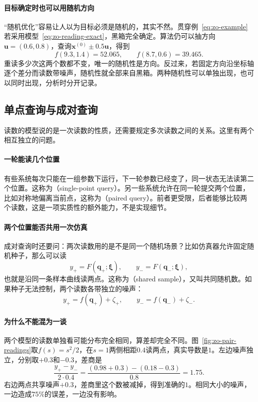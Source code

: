 \paragraph{目标确定时也可以用随机方向}
“随机优化”容易让人以为目标必须是随机的，其实不然。贯穿例~\eqref{eq:zo-example}若采用模型~\eqref{eq:zo-reading-exact}，黑箱完全确定。算法仍可以抽方向$\bm{u}=(0.6,0.8)$，查询$\bm{x}^{(0)}\pm0.5\bm{u}$，得到
\[
 f(9.3,1.4)=52.065,\qquad f(8.7,0.6)=39.465.
\]
重读多少次这两个数都不变，唯一的随机性是方向。反过来，若固定方向沿坐标轴逐个差分而读数带噪声，随机性就全部来自黑箱。两种随机性可以单独出现，也可以同时出现，分析时分开记录。

\subsection{单点查询与成对查询}
\label{sec:zo-pair-interface}

读数的模型说的是一次读数的性质，还需要规定多次读数之间的关系。这里有两个相互独立的问题。

\paragraph{一轮能读几个位置}
有些系统每次只能在一组参数下运行，下一轮参数已经变了，同一状态无法读第二个位置。这称为（single-point query）。另一些系统允许在同一轮提交两个位置，比如对称地偏离当前点，这称为（paired query）。前者更受限，后者能够比较两个读数，这是一项实质性的额外能力，不是实现细节。

\paragraph{两个位置能否共用一次仿真}
成对查询时还要问：两次读数用的是不是同一个随机场景？比如仿真器允许固定随机种子，那么可以读
\begin{equation}
 y_+=F(\bm{q}_+;\bm{\xi}),\qquad y_-=F(\bm{q}_-;\bm{\xi}),
 \label{eq:zo-shared-pair}
\end{equation}
也就是沿同一条样本曲线读两点。这称为（shared sample），又叫共同随机数。如果种子无法控制，两个读数各带独立的噪声：
\begin{equation}
 y_+=f(\bm{q}_+)+\zeta_+,\qquad y_-=f(\bm{q}_-)+\zeta_-.
 \label{eq:zo-independent-pair}
\end{equation}

\paragraph{为什么不能混为一谈}
两个模型的读数单独看可能分布完全相同，算差却完全不同。图~\ref{fig:zo-pair-readings}取$f(s)=s^2/2$，在$s=1$两侧相距$0.4$读两点，真实导数是$1$。左边噪声独立，分别取$+0.3$和$-0.3$，差商是
\[
 \frac{y_+-y_-}{2\cdot0.4}=\frac{(0.98+0.3)-(0.18-0.3)}{0.8}=1.75.
\]
右边两点共享噪声$+0.3$，差商里这个数被减掉，得到准确的$1$。相同大小的噪声，一边造成$75\%$的误差，一边没有影响。

